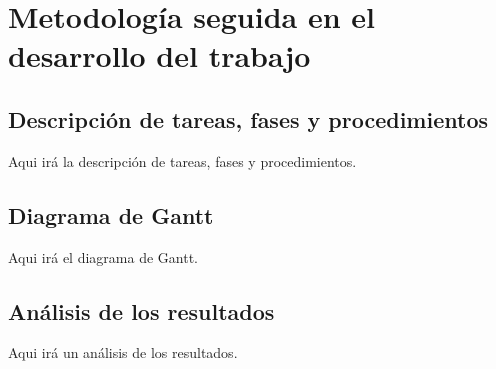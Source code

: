 
\chapter{Metodología seguida en el desarrollo del trabajo} %

\label{Metodología} %

\section{Descripción de tareas, fases y procedimientos}

Aqui irá la descripción de tareas, fases y procedimientos.

\section{Diagrama de Gantt}

Aqui irá el diagrama de Gantt.

\section{Análisis de los resultados}

Aqui irá un análisis de los resultados.



